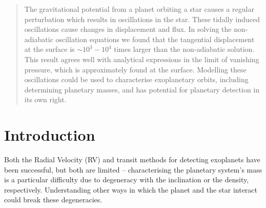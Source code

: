 \documentclass[a0,portrait]{a0poster}
\begin{document}
\vspace{1.0cm} %


\begin{multicols}{2} %


\color{Navy} %

\Large
\begin{abstract}
\large
The gravitational potential from a planet orbiting a star causes a regular perturbation which results in oscillations in the star. These tidally induced oscillations cause changes in displacement and flux. In solving the non-adiabatic oscillation equations we found that the tangential displacement at the surface is $\sim 10^{3} - 10^{4}$ times larger than the non-adiabatic solution. This result agrees well with analytical expressions in the limit of vanishing pressure, which is approximately found at the surface. Modelling these oscillations could be used to characterise exoplanetary orbits, including determining planetary masses, and has potential for planetary detection in its own right.
\normalsize
\end{abstract}
\normalsize


\color{Black} %

\section*{Introduction}

Both the Radial Velocity (RV) and transit methods for detecting exoplanets have been successful, but both are limited -- characterising the planetary system's mass is a particular difficulty due to degeneracy with the inclination or the density, respectively. Understanding other ways in which the planet and the star interact could break these degeneracies.


\end{multicols}
\end{document}
